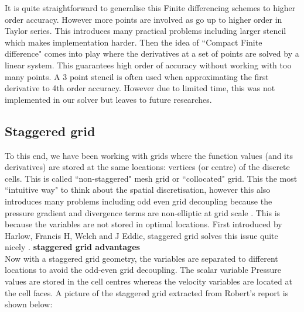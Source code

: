 It is quite straightforward to generalise this Finite differencing schemes to higher order accuracy. However more points are involved as go up to higher order in Taylor series. This introduces many practical problems including larger stencil which makes implementation harder. Then the idea of ``Compact Finite difference" comes into play where the derivatives at a set of points are solved by a linear system. This guarantees high order of accuracy without working with too many points. A 3 point stencil is often used when approximating the first derivative to 4th order accuracy. However due to limited time, this was not implemented in our solver but leaves to future researches.

\subsection{Staggered grid}
To this end, we have been working with grids where the function values (and its derivatives) are stored at the same locations: vertices (or centre) of the discrete cells. This is called ``non-staggered" mesh grid or ``collocated" grid. This the most ``intuitive way" to think about the spatial discretisation, however this also introduces many problems including odd even grid decoupling because the pressure gradient and divergence terms are non-elliptic at grid scale \cite{armfield2000fractional}. This is because the variables are not stored in optimal locations. First introduced by Harlow, Francis H, Welch and J Eddie, staggered grid solves this issue quite nicely \cite{harlow1965numerical}. \textbf{staggered grid advantages}\\

Now with a staggered grid geometry, the variables are separated to different locations to avoid the odd-even grid decoupling. The scalar variable Pressure values are stored in the cell centres whereas the velocity variables are located at the cell faces. A picture of the staggered grid extracted from Robert's report is shown below:


